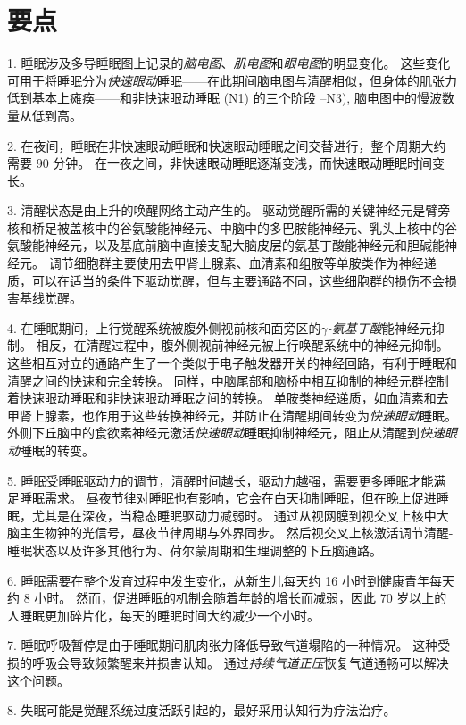 \section{要点}

1. 睡眠涉及多导睡眠图上记录的\textit{脑电图}、\textit{肌电图}和\textit{眼电图}的明显变化。
这些变化可用于将睡眠分为\textit{快速眼动}睡眠——在此期间脑电图与清醒相似，但身体的肌张力低到基本上瘫痪——和非快速眼动睡眠 (N1) 的三个阶段 –N3), 脑电图中的慢波数量从低到高。 


2. 在夜间，睡眠在非快速眼动睡眠和快速眼动睡眠之间交替进行，整个周期大约需要 90 分钟。
在一夜之间，非快速眼动睡眠逐渐变浅，而快速眼动睡眠时间变长。


3. 清醒状态是由上升的唤醒网络主动产生的。
驱动觉醒所需的关键神经元是臂旁核和桥足被盖核中的谷氨酸能神经元、中脑中的多巴胺能神经元、乳头上核中的谷氨酸能神经元，以及基底前脑中直接支配大脑皮层的氨基丁酸能神经元和胆碱能神经元。
调节细胞群主要使用去甲肾上腺素、血清素和组胺等单胺类作为神经递质，可以在适当的条件下驱动觉醒，但与主要通路不同，这些细胞群的损伤不会损害基线觉醒。 


4. 在睡眠期间，上行觉醒系统被腹外侧视前核和面旁区的\textit{$\gamma$-氨基丁酸}能神经元抑制。
相反，在清醒过程中，腹外侧视前神经元被上行唤醒系统中的神经元抑制。
这些相互对立的通路产生了一个类似于电子触发器开关的神经回路，有利于睡眠和清醒之间的快速和完全转换。
同样，中脑尾部和脑桥中相互抑制的神经元群控制着快速眼动睡眠和非快速眼动睡眠之间的转换。
单胺类神经递质，如血清素和去甲肾上腺素，也作用于这些转换神经元，并防止在清醒期间转变为\textit{快速眼动}睡眠。
外侧下丘脑中的食欲素神经元激活\textit{快速眼动}睡眠抑制神经元，阻止从清醒到\textit{快速眼动}睡眠的转变。


5. 睡眠受睡眠驱动力的调节，清醒时间越长，驱动力越强，需要更多睡眠才能满足睡眠需求。
昼夜节律对睡眠也有影响，它会在白天抑制睡眠，但在晚上促进睡眠，尤其是在深夜，当稳态睡眠驱动力减弱时。
通过从视网膜到视交叉上核中大脑主生物钟的光信号，昼夜节律周期与外界同步。
然后视交叉上核激活调节清醒-睡眠状态以及许多其他行为、荷尔蒙周期和生理调整的下丘脑通路。


6. 睡眠需要在整个发育过程中发生变化，从新生儿每天约 16 小时到健康青年每天约 8 小时。
然而，促进睡眠的机制会随着年龄的增长而减弱，因此 70 岁以上的人睡眠更加碎片化，每天的睡眠时间大约减少一个小时。


7. 睡眠呼吸暂停是由于睡眠期间肌肉张力降低导致气道塌陷的一种情况。
这种受损的呼吸会导致频繁醒来并损害认知。
通过\textit{持续气道正压}恢复气道通畅可以解决这个问题。


8. 失眠可能是觉醒系统过度活跃引起的，最好采用认知行为疗法治疗。


